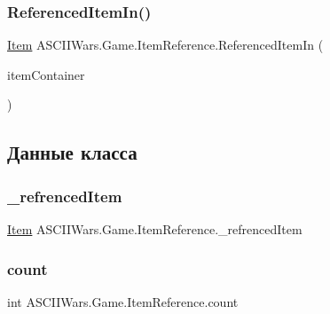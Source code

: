 \subsubsection{\texorpdfstring{Referenced\+Item\+In()}{ReferencedItemIn()}}
{\footnotesize\ttfamily \hyperlink{class_a_s_c_i_i_wars_1_1_game_1_1_item}{Item} A\+S\+C\+I\+I\+Wars.\+Game.\+Item\+Reference.\+Referenced\+Item\+In (\begin{DoxyParamCaption}\item[{\hyperlink{class_a_s_c_i_i_wars_1_1_game_1_1_item_container}{Item\+Container}}]{item\+Container }\end{DoxyParamCaption})\hspace{0.3cm}{\ttfamily [inline]}}



\subsection{Данные класса}
\hypertarget{class_a_s_c_i_i_wars_1_1_game_1_1_item_reference_a15d2baba4e97b1f60ae57f96f65429cb}{}\label{class_a_s_c_i_i_wars_1_1_game_1_1_item_reference_a15d2baba4e97b1f60ae57f96f65429cb} 
\subsubsection{\texorpdfstring{\+\_\+refrenced\+Item}{\_refrencedItem}}
{\footnotesize\ttfamily \hyperlink{class_a_s_c_i_i_wars_1_1_game_1_1_item}{Item} A\+S\+C\+I\+I\+Wars.\+Game.\+Item\+Reference.\+\_\+refrenced\+Item\hspace{0.3cm}{\ttfamily [private]}}

\hypertarget{class_a_s_c_i_i_wars_1_1_game_1_1_item_reference_a27438c24e65ee1a384eacf025c9e7e60}{}\label{class_a_s_c_i_i_wars_1_1_game_1_1_item_reference_a27438c24e65ee1a384eacf025c9e7e60} 
\subsubsection{\texorpdfstring{count}{count}}
{\footnotesize\ttfamily int A\+S\+C\+I\+I\+Wars.\+Game.\+Item\+Reference.\+count}

